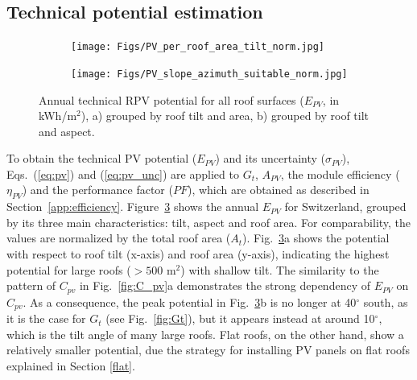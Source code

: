 
\subsection{Technical potential estimation}
\label{solar_tech}

\begin{figure}[tb]
\centering
\begin{subfigure}{.48\textwidth}
  \centering
  \texttt{[image: Figs/PV\_per\_roof\_area\_tilt\_norm.jpg]} 
  \subcaption{}
  \label{figa:pv_roof}
\end{subfigure}
\begin{subfigure}{.48\textwidth}
  \centering
  \texttt{[image: Figs/PV\_slope\_azimuth\_suitable\_norm.jpg]}
  \subcaption{}
  \label{figb:pv_roof}
\end{subfigure}
\caption{Annual technical RPV potential for all roof surfaces ($E_{PV}$, in kWh/m$^2$), a) grouped by roof tilt and area, b) grouped by roof tilt and aspect.}
\label{fig:pv_roof}
\end{figure}

To obtain the technical PV potential ($E_{PV}$) and its uncertainty ($\sigma_{PV}$), Eqs.~(\ref{eq:pv}) and (\ref{eq:pv_unc}) are applied to $G_t$, $A_{PV}$, the module efficiency ($\eta_{PV}$) and the performance factor ($\mathit{PF}$), which are obtained as described in Section~\ref{app:efficiency}.
%
Figure~\ref{fig:pv_roof} shows the annual $E_{PV}$ for Switzerland, grouped by its three main characteristics: tilt, aspect and roof area. For comparability, the values are normalized by the total roof area ($A_t$). 
Fig.~\ref{fig:pv_roof}a shows the potential with respect to roof tilt (x-axis) and roof area (y-axis), indicating the highest potential for large roofs ($> 500$ m$^2$) with shallow tilt. 
The similarity to the pattern of $C_{\mathit{pv}}$ in Fig.~\ref{fig:C_pv}a demonstrates the strong dependency of $E_{PV}$ on $C_{\mathit{pv}}$.
As a consequence, the peak potential in Fig.~\ref{fig:pv_roof}b is no longer at 40$^\circ$ south, as it is the case for $G_t$ (see Fig.~\ref{fig:Gt}), but it appears instead at around 10$^\circ$, which is the tilt angle of many large roofs. 
Flat roofs, on the other hand, show a relatively smaller potential, due the strategy for installing PV panels on flat roofs explained in Section \ref{flat}.

